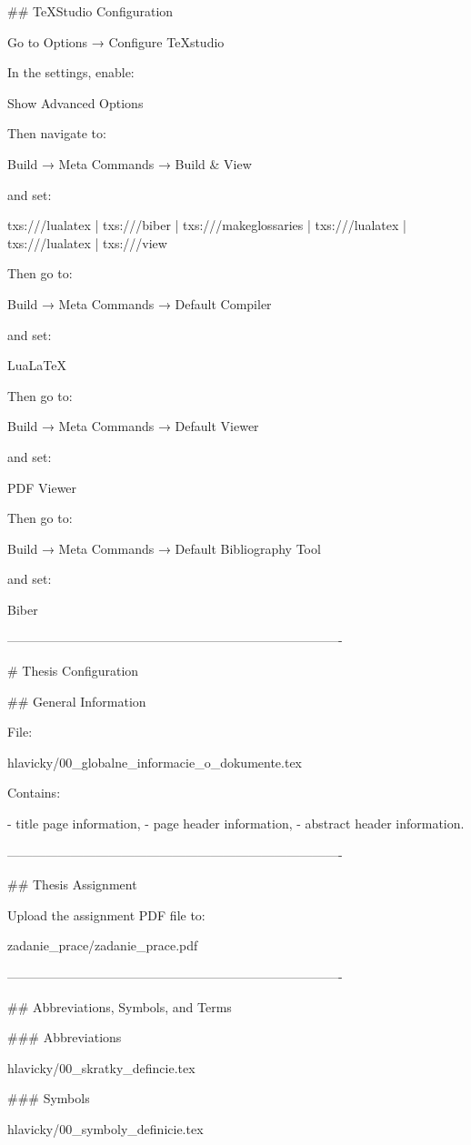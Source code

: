 ## TeXStudio Configuration

Go to Options → Configure TeXstudio

In the settings, enable:

Show Advanced Options

Then navigate to:

Build → Meta Commands → Build & View

and set:

txs:///lualatex |
txs:///biber |
txs:///makeglossaries |
txs:///lualatex |
txs:///lualatex |
txs:///view

Then go to:

Build → Meta Commands → Default Compiler

and set:

LuaLaTeX

Then go to:

Build → Meta Commands → Default Viewer

and set:

PDF Viewer

Then go to:

Build → Meta Commands → Default Bibliography Tool

and set:

Biber

-------------------------------------------------------------------------------

# Thesis Configuration

## General Information

File:

hlavicky/00_globalne_informacie_o_dokumente.tex

Contains:

- title page information,
- page header information,
- abstract header information.

-------------------------------------------------------------------------------

## Thesis Assignment

Upload the assignment PDF file to:

zadanie_prace/zadanie_prace.pdf

-------------------------------------------------------------------------------

## Abbreviations, Symbols, and Terms

### Abbreviations

hlavicky/00_skratky_defincie.tex

### Symbols

hlavicky/00_symboly_definicie.tex

